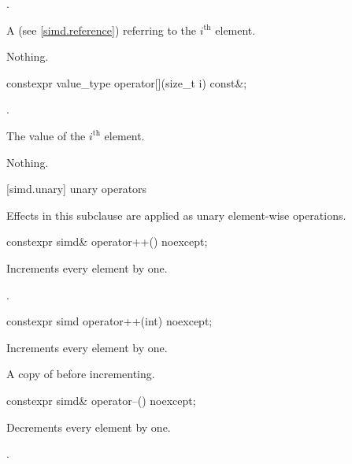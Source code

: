 \begin{itemdescr}
  \pnum\requires
  .

  \pnum\returns
  A  (see \ref{simd.reference}) referring to the $i^\text{th}$ element.

  \pnum\throws Nothing.
\end{itemdescr}

\begin{itemdecl}
constexpr value_type operator[](size_t i) const&;
\end{itemdecl}

\begin{itemdescr}
  \pnum\requires
  .

  \pnum\returns
  The value of the $i^\text{th}$ element.

  \pnum\throws Nothing.
\end{itemdescr}

[simd.unary]{ unary operators}

\pnum
Effects in this subclause are applied as unary element-wise operations.

\begin{itemdecl}
constexpr simd& operator++() noexcept;
\end{itemdecl}

\begin{itemdescr}
  \pnum{}

  \pnum\effects
  Increments every element by one.

  \pnum\returns
  .
\end{itemdescr}

\begin{itemdecl}
constexpr simd operator++(int) noexcept;
\end{itemdecl}

\begin{itemdescr}
  \pnum{}

  \pnum\effects
  Increments every element by one.

  \pnum\returns
  A copy of  before incrementing.
\end{itemdescr}

\begin{itemdecl}
constexpr simd& operator--() noexcept;
\end{itemdecl}

\begin{itemdescr}
  \pnum{}

  \pnum\effects
  Decrements every element by one.

  \pnum\returns
  .
\end{itemdescr}

